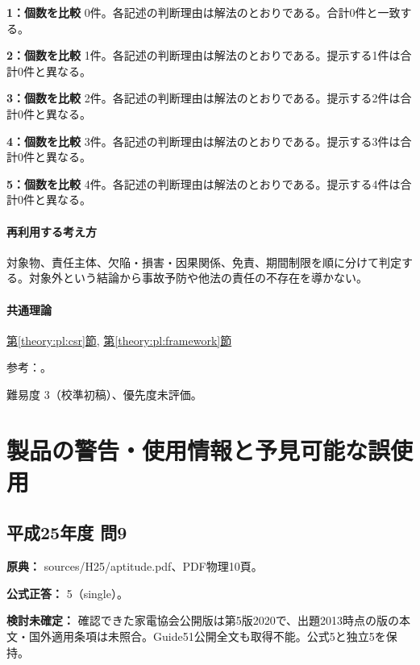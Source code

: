 \noindent\textbf{1：個数を比較} 0件。各記述の判断理由は解法のとおりである。合計0件と一致する。\par

\noindent\textbf{2：個数を比較} 1件。各記述の判断理由は解法のとおりである。提示する1件は合計0件と異なる。\par

\noindent\textbf{3：個数を比較} 2件。各記述の判断理由は解法のとおりである。提示する2件は合計0件と異なる。\par

\noindent\textbf{4：個数を比較} 3件。各記述の判断理由は解法のとおりである。提示する3件は合計0件と異なる。\par

\noindent\textbf{5：個数を比較} 4件。各記述の判断理由は解法のとおりである。提示する4件は合計0件と異なる。\par

\paragraph{再利用する考え方} 対象物、責任主体、欠陥・損害・因果関係、免責、期間制限を順に分けて判定する。対象外という結論から事故予防や他法の責任の不存在を導かない。

\paragraph{共通理論} \hyperref[theory:pl:csr]{第\ref*{theory:pl:csr}節}, \hyperref[theory:pl:framework]{第\ref*{theory:pl:framework}節}

\par 参考：\cite{pl_product_csr2016}。

\par 難易度 3（校準初稿）、優先度未評価。

\section{製品の警告・使用情報と予見可能な誤使用}

\subsection{平成25年度 問9}
\label{q:h25-reg-apt-09}

\noindent\textbf{原典：} sources/H25/aptitude.pdf、PDF物理10頁。

\textbf{公式正答：} 5（single）。

\par\textbf{検討未確定：} 確認できた家電協会公開版は第5版2020で、出題2013時点の版の本文・国外適用条項は未照合。Guide51公開全文も取得不能。公式5と独立5を保持。

